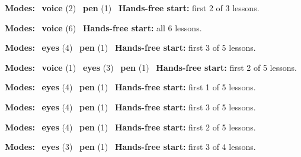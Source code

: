 \expandafter\def\csname hlchaptermodality31\endcsname{%
  {\small\noindent
    \textbf{Modes:} \hlvoicesign{}~\textbf{voice} (2) \quad \hlpensign{}~\textbf{pen} (1)\quad
    \hlvoicesign{}~\textbf{Hands-free start:} first 2 of 3 lessons.%
    \par}\medskip
}

\expandafter\def\csname hlchaptermodality32\endcsname{%
  {\small\noindent
    \textbf{Modes:} \hlvoicesign{}~\textbf{voice} (6)\quad
    \hlvoicesign{}~\textbf{Hands-free start:} all 6 lessons.%
    \par}\medskip
}

\expandafter\def\csname hlchaptermodality33\endcsname{%
  {\small\noindent
    \textbf{Modes:} \hlsightsign{}~\textbf{eyes} (4) \quad \hlpensign{}~\textbf{pen} (1)\quad
    \hlvoicesign{}~\textbf{Hands-free start:} first 3 of 5 lessons.%
    \par}\medskip
}

\expandafter\def\csname hlchaptermodality34\endcsname{%
  {\small\noindent
    \textbf{Modes:} \hlvoicesign{}~\textbf{voice} (1) \quad \hlsightsign{}~\textbf{eyes} (3) \quad \hlpensign{}~\textbf{pen} (1)\quad
    \hlvoicesign{}~\textbf{Hands-free start:} first 2 of 5 lessons.%
    \par}\medskip
}

\expandafter\def\csname hlchaptermodality35\endcsname{%
  {\small\noindent
    \textbf{Modes:} \hlsightsign{}~\textbf{eyes} (4) \quad \hlpensign{}~\textbf{pen} (1)\quad
    \hlvoicesign{}~\textbf{Hands-free start:} first 1 of 5 lessons.%
    \par}\medskip
}

\expandafter\def\csname hlchaptermodality36\endcsname{%
  {\small\noindent
    \textbf{Modes:} \hlsightsign{}~\textbf{eyes} (4) \quad \hlpensign{}~\textbf{pen} (1)\quad
    \hlvoicesign{}~\textbf{Hands-free start:} first 3 of 5 lessons.%
    \par}\medskip
}

\expandafter\def\csname hlchaptermodality37\endcsname{%
  {\small\noindent
    \textbf{Modes:} \hlsightsign{}~\textbf{eyes} (4) \quad \hlpensign{}~\textbf{pen} (1)\quad
    \hlvoicesign{}~\textbf{Hands-free start:} first 2 of 5 lessons.%
    \par}\medskip
}

\expandafter\def\csname hlchaptermodality38\endcsname{%
  {\small\noindent
    \textbf{Modes:} \hlsightsign{}~\textbf{eyes} (3) \quad \hlpensign{}~\textbf{pen} (1)\quad
    \hlvoicesign{}~\textbf{Hands-free start:} first 3 of 4 lessons.%
    \par}\medskip
}

